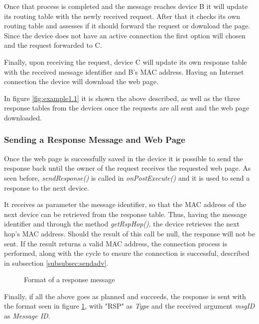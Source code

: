 Once that process is completed and the message reaches device B it will update its routing table with the newly received request. After that it checks its own routing table and assesses if it should forward the request or download the page. Since the device does not have an active connection the first option will chosen and the request forwarded to C.

Finally, upon receiving the request, device C will update its own response table with the received message identifier and B's \gls{MAC} address. Having an Internet connection the device will download the web page.

In figure \ref{fig:example1.1} it is shown the above described, as well as the three response tables from the devices once the requests are all sent and the web page downloaded.

\subsubsection{Sending a Response Message and Web Page}
\label{subsubsec:sendrsp}

Once the web page is successfully saved in the device it is possible to send the response back until the owner of the request receives the requested web page. As seen before, \textit{sendResponse()} is called in \textit{onPostExecute()} and it is used to send a response to the next device.

It receives as parameter the message identifier, so that the \gls{MAC} address of the next device can be retrieved from the response table. Thus, having the message identifier and through the method \textit{getRspHop()}, the device retrieves the next hop's \gls{MAC} address. Should the result of this call be null, the response will not be sent. If the result returns a valid \gls{MAC} address, the connection process is performed, along with the cycle to ensure the connection is successful, described in subsection \ref{subsubsec:sendadv}.

\begin{figure}[ht]
   \noindent{}
	\caption{\label{fig:rspmsg} Format of a response message}
\end{figure}

Finally, if all the above goes as planned and succeeds, the response is sent with the format seen in figure \ref{fig:rspmsg}, with "RSP" as \textit{Type} and the received argument \textit{msgID} as \textit{Message ID}.

